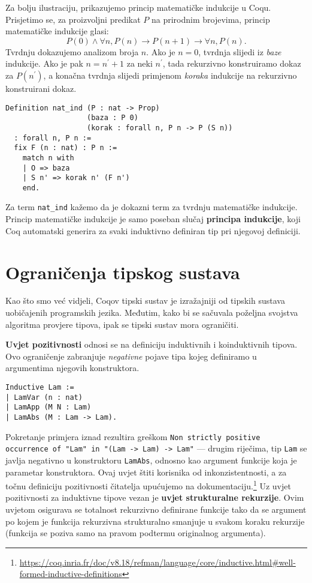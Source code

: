 Za bolju ilustraciju, prikazujemo princip matematičke indukcije u Coqu.
Prisjetimo se, za proizvoljni predikat \(P\) na prirodnim brojevima, princip matematičke indukcije glasi:
\[
  P(0) \land \forall n, P(n) \rightarrow P(n + 1) \rightarrow \forall n, P(n).
\]
\noindent Tvrdnju dokazujemo analizom broja \(n\).
Ako je \(n = 0\), tvrdnja slijedi iz \textit{baze} indukcije.
Ako je pak \(n = n^{\prime} + 1\) za neki \(n^{\prime}\), tada rekurzivno konstruiramo dokaz za \(P(n^{\prime})\), a konačna tvrdnja slijedi primjenom \textit{koraka} indukcije na rekurzivno konstruirani dokaz.
\begin{verbatim}
Definition nat_ind (P : nat -> Prop)
                   (baza : P 0)
                   (korak : forall n, P n -> P (S n))
  : forall n, P n :=
  fix F (n : nat) : P n :=
    match n with
    | O => baza
    | S n' => korak n' (F n')
    end.
\end{verbatim}
Za term \texttt{nat\_ind} kažemo da je dokazni term  za tvrdnju matematičke indukcije.
Princip matematičke indukcije je samo poseban slučaj \textbf{principa indukcije},
koji Coq automatski generira za svaki induktivno definiran tip pri njegovoj definiciji.

\section{Ograničenja tipskog sustava}\label{sec:ogranicenja}
Kao što smo već vidjeli, Coqov tipski sustav je izražajniji od tipskih sustava uobičajenih programskih jezika.
Međutim, kako bi se sačuvala poželjna svojstva algoritma provjere tipova, ipak se tipski sustav mora ograničiti.

\textbf{Uvjet pozitivnosti} odnosi se na definiciju induktivnih i koinduktivnih tipova. 
Ovo ograničenje zabranjuje \textit{negativne} pojave tipa kojeg definiramo u argumentima njegovih konstruktora.
\begin{verbatim}
Inductive Lam :=
| LamVar (n : nat)
| LamApp (M N : Lam)
| LamAbs (M : Lam -> Lam).
\end{verbatim}
\noindent Pokretanje primjera iznad rezultira greškom \texttt{Non strictly positive occurrence of "Lam" in "(Lam -> Lam) -> Lam"} ---
drugim riječima, tip \texttt{Lam} se javlja negativno u konstruktoru \texttt{LamAbs}, odnosno kao argument funkcije koja je parametar konstruktora.
Ovaj uvjet štiti korisnika od inkonzistentnosti, a za točnu definiciju pozitivnosti čitatelja upućujemo na dokumentaciju.\footnote{\url{https://coq.inria.fr/doc/v8.18/refman/language/core/inductive.html\#well-formed-inductive-definitions}}
Uz uvjet pozitivnosti za induktivne tipove vezan je \textbf{uvjet strukturalne rekurzije}.
Ovim uvjetom osigurava se totalnost rekurzivno definirane funkcije
tako da se argument po kojem je funkcija rekurzivna strukturalno smanjuje u svakom koraku rekurzije 
(funkcija se poziva samo na pravom podtermu originalnog argumenta).


